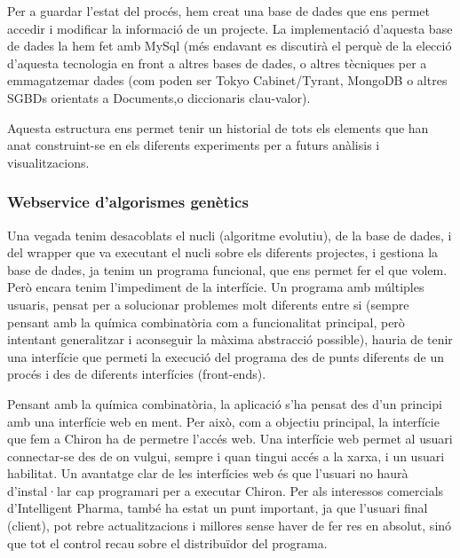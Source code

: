 Per a guardar l'estat del procés, hem creat una base de dades que ens permet
accedir i modificar la informació de un projecte.  La implementació d'aquesta
base de dades la hem fet amb MySql (més endavant es discutirà el perquè de la
elecció d'aquesta tecnologia en front a altres bases de dades, o altres
tècniques per a emmagatzemar dades (com poden ser Tokyo Cabinet/Tyrant, MongoDB
o altres SGBDs orientats a Documents,o diccionaris clau-valor).

\lstset{language=sql, tabsize=2}
\lstset{commentstyle=\textit}


Aquesta estructura ens permet tenir un historial de tots els elements que han
anat construint-se en els diferents experiments per a futurs anàlisis i
visualitzacions.

\subsubsection{Webservice d'algorismes genètics} %
\label{ssub:Webservice d'algorismes genetics}

Una vegada tenim desacoblats el nucli (algoritme evolutiu), de la base de dades,
i del wrapper que va executant el nucli sobre els diferents projectes, i gestiona
la base de dades, ja tenim un programa funcional, que ens permet fer el que
volem.  Però encara tenim l'impediment de la interfície.  Un programa amb
múltiples usuaris, pensat per a solucionar problemes molt diferents entre si
(sempre pensant amb la química combinatòria com a funcionalitat principal,
 però intentant generalitzar i aconseguir la màxima abstracció possible), hauria
de tenir una interfície que permeti la execució del programa des de punts
diferents de un procés i des de diferents interfícies (front-ends).

Pensant amb la química combinatòria, la aplicació s'ha pensat des
d'un principi amb una interfície web en ment.  Per això, com a objectiu
principal, la interfície que fem a Chiron ha de permetre l'accés web.  Una
interfície web permet al usuari connectar-se des de on vulgui, sempre i quan
tingui accés a la xarxa, i un usuari habilitat.  Un avantatge clar de les
interfícies web és que l'usuari no haurà d'instal·lar cap programari per a executar
Chiron.  Per als interessos comercials d'Intelligent Pharma, també ha estat un
punt important, ja que l'usuari  final (client), pot rebre actualitzacions i
millores sense haver de fer res en absolut, sinó que tot el control recau sobre
el distribuïdor del programa.

